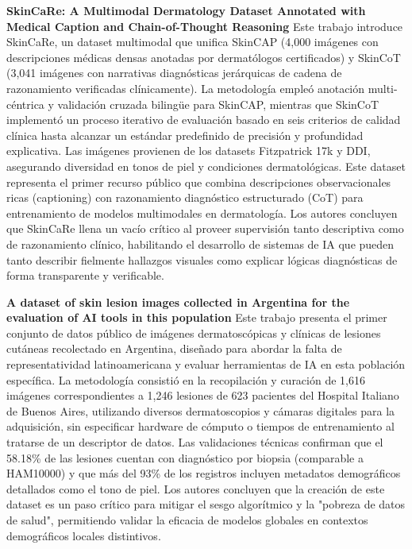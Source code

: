 \documentclass[11pt, a4paper]{article}
\begin{document}
\textbf{SkinCaRe: A Multimodal Dermatology Dataset Annotated with Medical Caption and Chain-of-Thought Reasoning}
Este trabajo introduce SkinCaRe, un dataset multimodal que unifica SkinCAP (4,000 imágenes con descripciones médicas densas anotadas por dermatólogos certificados) y SkinCoT (3,041 imágenes con narrativas diagnósticas jerárquicas
de cadena de razonamiento verificadas clínicamente). La metodología empleó anotación multi-céntrica y validación cruzada bilingüe para SkinCAP, mientras que SkinCoT implementó un proceso iterativo de evaluación basado en seis 
criterios de calidad clínica hasta alcanzar un estándar predefinido de precisión y profundidad explicativa. Las imágenes provienen de los datasets Fitzpatrick 17k y DDI, asegurando diversidad en tonos de piel y condiciones 
dermatológicas. Este dataset representa el primer recurso público que combina descripciones observacionales ricas (captioning) con razonamiento diagnóstico estructurado (CoT) para entrenamiento de modelos multimodales en
dermatología. Los autores concluyen que SkinCaRe llena un vacío crítico al proveer supervisión tanto descriptiva como de razonamiento clínico, habilitando el desarrollo de sistemas de IA que pueden tanto describir fielmente hallazgos
visuales como explicar lógicas diagnósticas de forma transparente y verificable.

\textbf{A dataset of skin lesion images collected in Argentina for the evaluation of AI tools in this population} \cite{ricci_lara_dataset_2023}
Este trabajo presenta el primer conjunto de datos público de imágenes dermatoscópicas y clínicas de lesiones cutáneas recolectado en Argentina, diseñado para abordar la falta de representatividad latinoamericana y evaluar herramientas
de IA en esta población específica. La metodología consistió en la recopilación y curación de 1,616 imágenes correspondientes a 1,246 lesiones de 623 pacientes del Hospital Italiano de Buenos Aires, utilizando diversos dermatoscopios
y cámaras digitales para la adquisición, sin especificar hardware de cómputo o tiempos de entrenamiento al tratarse de un descriptor de datos. Las validaciones técnicas confirman que el 58.18\% de las lesiones cuentan con diagnóstico
por biopsia (comparable a HAM10000) y que más del 93\% de los registros incluyen metadatos demográficos detallados como el tono de piel. Los autores concluyen que la creación de este dataset es un paso crítico para mitigar el sesgo 
algorítmico y la "pobreza de datos de salud", permitiendo validar la eficacia de modelos globales en contextos demográficos locales distintivos.
\end{document}
